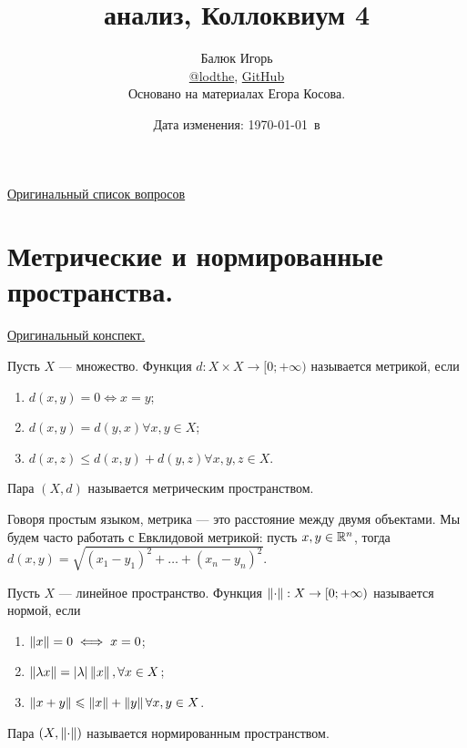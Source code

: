 \documentclass[a4paper]{article}
\title{\HugeМатематический анализ, Коллоквиум 4}
\author{
	Балюк Игорь \\
	\href{https://teleg.run/lodthe}{@lodthe},
    \href{https://github.com/LoDThe/hse-tex}{GitHub} \\
    Основано на материалах Егора Косова.
}
\date{Дата изменения: \today \ в \currenttime}
\theoremstyle{named}
\begin{document}
    \maketitle

    \tableofcontents

    \newpage

    \href{https://www.youtube.com/watch?v=dQw4w9WgXcQ}{Оригинальный список вопросов}

    \section{Метрические и нормированные пространства.}

        \href{https://www.dropbox.com/s/donysz87em9jfhs/%D0%9B%D0%B5%D0%BA%D1%86%D0%B8%D1%8F%208.pdf?dl=0}{Оригинальный конспект.}

        \begin{definition*}
            Пусть $X$ --- множество. Функция $d: X \times X \to [0; +\infty)$ называется метрикой, если
            \begin{enumerate}
            \item $d(x, y) = 0 \iff x = y$;
            \item $d(x, y) = d(y, x) \forall x, y \in X$;
            \item $d(x, z) \leq d(x, y) + d(y, z) \forall x, y, z \in X$.
            \end{enumerate}

            Пара $(X, d)$ называется метрическим пространством.
        \end{definition*}

        Говоря простым языком, метрика --- это расстояние между двумя объектами. Мы будем часто работать с Евклидовой метрикой: пусть $x, y \in \mathbb{R}^n$, тогда $d(x, y) = \sqrt{(x_1 - y_1)^2 + \dots + (x_n - y_n)^2}$.

        \begin{definition*}
            Пусть $X$ --- линейное пространство. Функция $\left\lVert\cdot\right\rVert: X \to [0; +\infty)$ называется нормой, если
            \begin{enumerate}
            \item $\left\lVert x\right\rVert = 0 \iff x = 0$;
            \item $\left\lVert\lambda x\right\rVert = |\lambda| \left\lVert x\right\rVert, \forall x \in X$;
            \item $\left\lVert x + y\right\rVert \leqslant \left\lVert x\right\rVert + \left\lVert y\right\rVert \forall x, y \in X$.
            \end{enumerate}

            Пара $(X, \left\lVert\cdot\right\rVert)$ называется нормированным пространством.
        \end{definition*}
\end{document}
